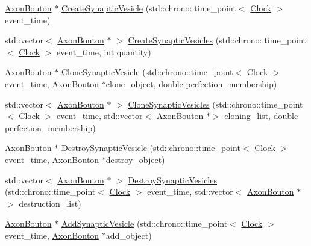 \begin{DoxyCompactItemize}
\item 
\mbox{\hyperlink{classAxonBouton}{Axon\+Bouton}} $\ast$ \mbox{\hyperlink{classAxonBouton_a2aa0abe381f6e7c87c702189d01dfbf2}{Create\+Synaptic\+Vesicle}} (std\+::chrono\+::time\+\_\+point$<$ \mbox{\hyperlink{universe_8h_a0ef8d951d1ca5ab3cfaf7ab4c7a6fd80}{Clock}} $>$ event\+\_\+time)
\item 
std\+::vector$<$ \mbox{\hyperlink{classAxonBouton}{Axon\+Bouton}} $\ast$ $>$ \mbox{\hyperlink{classAxonBouton_a0cabe429536722f14ae800c8579168b7}{Create\+Synaptic\+Vesicles}} (std\+::chrono\+::time\+\_\+point$<$ \mbox{\hyperlink{universe_8h_a0ef8d951d1ca5ab3cfaf7ab4c7a6fd80}{Clock}} $>$ event\+\_\+time, int quantity)
\item 
\mbox{\hyperlink{classAxonBouton}{Axon\+Bouton}} $\ast$ \mbox{\hyperlink{classAxonBouton_a0e739b20447539f8db3655e83575fcf4}{Clone\+Synaptic\+Vesicle}} (std\+::chrono\+::time\+\_\+point$<$ \mbox{\hyperlink{universe_8h_a0ef8d951d1ca5ab3cfaf7ab4c7a6fd80}{Clock}} $>$ event\+\_\+time, \mbox{\hyperlink{classAxonBouton}{Axon\+Bouton}} $\ast$clone\+\_\+object, double perfection\+\_\+membership)
\item 
std\+::vector$<$ \mbox{\hyperlink{classAxonBouton}{Axon\+Bouton}} $\ast$ $>$ \mbox{\hyperlink{classAxonBouton_a7bf1d8db3287dc5357d0095233f5c47f}{Clone\+Synaptic\+Vesicles}} (std\+::chrono\+::time\+\_\+point$<$ \mbox{\hyperlink{universe_8h_a0ef8d951d1ca5ab3cfaf7ab4c7a6fd80}{Clock}} $>$ event\+\_\+time, std\+::vector$<$ \mbox{\hyperlink{classAxonBouton}{Axon\+Bouton}} $\ast$$>$ cloning\+\_\+list, double perfection\+\_\+membership)
\item 
\mbox{\hyperlink{classAxonBouton}{Axon\+Bouton}} $\ast$ \mbox{\hyperlink{classAxonBouton_a75592b4ccc589db756183f4aaa694ffe}{Destroy\+Synaptic\+Vesicle}} (std\+::chrono\+::time\+\_\+point$<$ \mbox{\hyperlink{universe_8h_a0ef8d951d1ca5ab3cfaf7ab4c7a6fd80}{Clock}} $>$ event\+\_\+time, \mbox{\hyperlink{classAxonBouton}{Axon\+Bouton}} $\ast$destroy\+\_\+object)
\item 
std\+::vector$<$ \mbox{\hyperlink{classAxonBouton}{Axon\+Bouton}} $\ast$ $>$ \mbox{\hyperlink{classAxonBouton_a0fa1c238a29d9e2b84b4d9c556452150}{Destroy\+Synaptic\+Vesicles}} (std\+::chrono\+::time\+\_\+point$<$ \mbox{\hyperlink{universe_8h_a0ef8d951d1ca5ab3cfaf7ab4c7a6fd80}{Clock}} $>$ event\+\_\+time, std\+::vector$<$ \mbox{\hyperlink{classAxonBouton}{Axon\+Bouton}} $\ast$$>$ destruction\+\_\+list)
\item 
\mbox{\hyperlink{classAxonBouton}{Axon\+Bouton}} $\ast$ \mbox{\hyperlink{classAxonBouton_a3009e5d49c699afa7f633b026b37ed77}{Add\+Synaptic\+Vesicle}} (std\+::chrono\+::time\+\_\+point$<$ \mbox{\hyperlink{universe_8h_a0ef8d951d1ca5ab3cfaf7ab4c7a6fd80}{Clock}} $>$ event\+\_\+time, \mbox{\hyperlink{classAxonBouton}{Axon\+Bouton}} $\ast$add\+\_\+object)

\end{DoxyCompactItemize}
